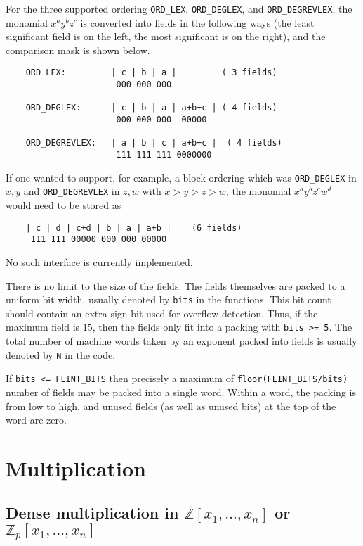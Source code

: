 \documentclass[11pt,reqno]{amsart}
\numberwithin{equation}{section}
\newcommand{\bbZ}[0]  { \mathbb{Z}}
\begin{document}
For the three supported ordering {\tt ORD\_LEX}, {\tt ORD\_DEGLEX}, and {\tt ORD\_DEGREVLEX}, the
monomial $x^a y^b z^c$ is converted into fields in the following ways (the
least significant field is on the left, the most significant is on the right),
and the comparison mask is shown below.

\begin{verbatim}
    ORD_LEX:         | c | b | a |         ( 3 fields)
                      000 000 000

    ORD_DEGLEX:      | c | b | a | a+b+c | ( 4 fields)
                      000 000 000  00000

    ORD_DEGREVLEX:   | a | b | c | a+b+c |  ( 4 fields)
                      111 111 111 0000000
\end{verbatim}

If one wanted to support, for example, a block ordering which was
{\tt ORD\_DEGLEX} in $x, y$ and {\tt ORD\_DEGREVLEX} in $z, w$ with $x>y>z>w$,
the monomial $x^a y^b z^c w^d$ would need to be stored as

\begin{verbatim}
    | c | d | c+d | b | a | a+b |    (6 fields)
     111 111 00000 000 000 00000
\end{verbatim}

No such interface is currently implemented.


There is no limit to the size of the fields. The fields themselves are packed
to a uniform bit width, usually denoted by {\tt bits} in the functions. This
bit count should contain an extra sign bit used for overflow detection. Thus,
if the maximum field is $15$, then the fields only fit into a packing with
{\tt bits >= 5}. The total number of machine words taken by an exponent packed 
into fields is usually denoted by {\tt N} in the code.

If {\tt bits <= FLINT\_BITS} then precisely a maximum of
{\tt floor(FLINT\_BITS/bits)} number of fields may be packed into a single
word. Within a word, the packing is from low to high, and unused fields (as
well as unused bits) at the top of the word are zero.

\section{Multiplication}
\subsection{Dense multiplication in $\bbZ[x_1,\dots,x_n]$ or $\bbZ_p[x_1,\dots,x_n]$}\
\end{document}
